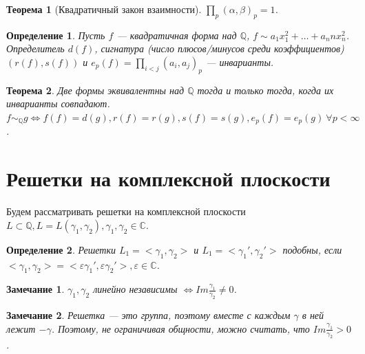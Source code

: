 \documentclass[11pt]{article}
\newtheorem{theorem}{Теорема}
\newtheorem{definition}{Определение}
\newtheorem{remark}{Замечание}
\newcommand{\Q}{\mathbb{Q}}
\begin{document}
\begin{theorem}[Квадратичный закон взаимности]
    $\prod_p (\alpha, \beta)_p = 1$.
\end{theorem}

\begin{definition}
    Пусть $f$ --- квадратичная форма над $\Q$, $f \sim a_1 x_1^2 + \dots + a_nn x_n^2$.
    Определитель $d(f)$, сигнатура (число плюсов/минусов среди коэффициентов) $(r(f), s(f))$ и $e_p(f) = \prod_{i < j} (a_i, a_j)_p$ --- инварианты.
\end{definition}

\begin{theorem}
    Две формы эквивалентны над $\Q$ тогда и только тогда, когда их инварианты совпадают.
    $f \sim_{\Q} g \iff f(f) = d(g), r(f) = r(g), s(f) = s(g), e_p(f) = e_p(g)\ \forall p < \infty$.
\end{theorem}



\section*{Решетки на комплексной плоскости}

Будем рассматривать решетки на комплексной плоскости $L \subset \Q, L = L(\gamma_1, \gamma_2), \gamma_1, \gamma_2 \in \mathbb{C}$.

\begin{definition}
    Решетки $L_1 = <\gamma_1, \gamma_2>$ и $L_1 = <\gamma_1', \gamma_2'>$ подобны, если $<\gamma_1, \gamma_2> = <\varepsilon \gamma_1', \varepsilon \gamma_2'>, \varepsilon \in \mathbb{C}$.
\end{definition}

\begin{remark}
    $\gamma_1, \gamma_2$ линейно независимы $\iff Im \frac{\gamma_1}{\gamma_2} \neq 0$.
\end{remark}

\begin{remark}
    Решетка --- это группа, поэтому вместе с каждым $\gamma$ в ней лежит $-\gamma$.
    Поэтому, не ограничивая общности, можно считать, что $Im \frac{\gamma_1}{\gamma_2} > 0$.
\end{remark}
\end{document}
